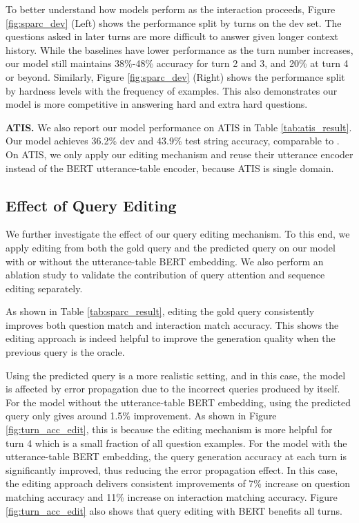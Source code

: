 \documentclass[11pt,a4paper]{article}
\begin{document}
To better understand how models perform as the interaction proceeds, Figure \ref{fig:sparc_dev} (Left) shows the performance split by turns on the dev set.
The questions asked in later turns are more difficult to answer given longer context history.
While the baselines have lower performance as the turn number increases, our model still maintains 38\%-48\% accuracy for turn 2 and 3, and 20\% at turn 4 or beyond.
Similarly, Figure \ref{fig:sparc_dev} (Right) shows the performance split by hardness levels with the frequency of examples.
This also demonstrates our model is more competitive in answering hard and extra hard questions.

\textbf{ATIS.}
We also report our model performance on ATIS in Table \ref{tab:atis_result}.
Our model achieves 36.2\% dev and 43.9\% test string accuracy, comparable to .
On ATIS, we only apply our editing mechanism and reuse their utterance encoder instead of the BERT utterance-table encoder, because ATIS is single domain.

\subsection{Effect of Query Editing}
We further investigate the effect of our query editing mechanism.
To this end, we apply editing from both the gold query and the predicted query on our model with or without the utterance-table BERT embedding.
We also perform an ablation study to validate the contribution of query attention and sequence editing separately.

As shown in Table \ref{tab:sparc_result}, editing the gold query consistently improves both question match and interaction match accuracy.
This shows the editing approach is indeed helpful to improve the generation quality when the previous query is the oracle.

Using the predicted query is a more realistic setting, and in this case, the model is affected by error propagation due to the incorrect queries produced by itself.
For the model without the utterance-table BERT embedding, using the predicted query only gives around 1.5\% improvement.
As shown in Figure \ref{fig:turn_acc_edit}, this is because the editing mechanism is more helpful for turn 4 which is a small fraction of all question examples.
For the model with the utterance-table BERT embedding, the query generation accuracy at each turn is significantly improved, thus reducing the error propagation effect.
In this case, the editing approach delivers consistent improvements of 7\% increase on question matching accuracy and 11\% increase on interaction matching accuracy.
Figure \ref{fig:turn_acc_edit} also shows that query editing with BERT benefits all turns.
\end{document}
